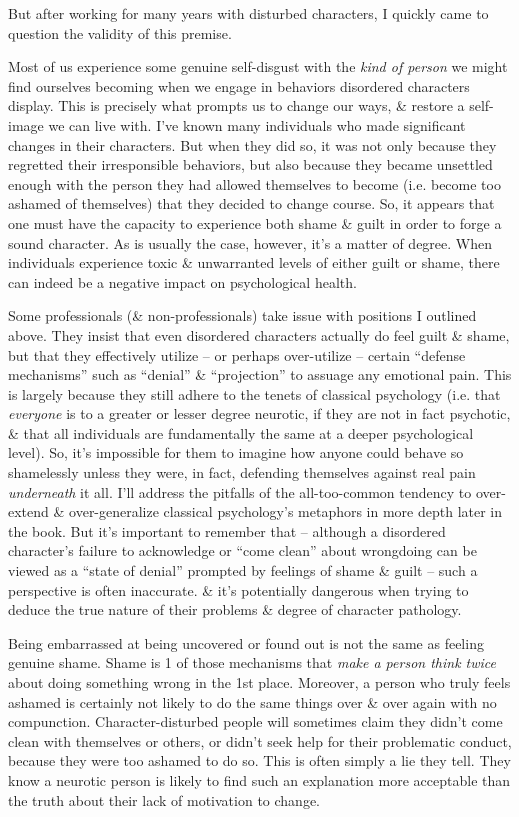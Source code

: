 \documentclass{article}
\numberwithin{equation}{section}
\begin{document}
But after working for many years with disturbed characters, I quickly came to question the validity of this premise.

Most of us experience some genuine self-disgust with  the \textit{kind of person} we might find ourselves becoming when we engage in behaviors disordered characters display. This is precisely what prompts us to change our ways, \& restore a self-image we can live with. I've known many individuals who made significant changes in their characters. But when they did so, it was not only because they regretted their irresponsible behaviors, but also because they became unsettled enough with the person they had allowed themselves to become (i.e. become too ashamed of themselves) that they decided to change course. So, it appears that one must have the capacity to experience both shame \& guilt in order to forge a sound character. As is usually the case, however, it's a matter of degree. When individuals experience toxic \& unwarranted levels of either guilt or shame, there can indeed be a negative impact on psychological health.

Some professionals (\& non-professionals) take issue with positions I outlined above. They insist that even disordered characters actually do feel guilt \& shame, but that they effectively utilize -- or perhaps over-utilize -- certain ``defense mechanisms'' such as ``denial'' \& ``projection'' to assuage any emotional pain. This is largely because they still adhere to the tenets of classical psychology (i.e. that \textit{everyone} is to a greater or lesser degree neurotic, if they are not in fact psychotic, \& that all individuals are fundamentally the same at a deeper psychological level). So, it's impossible for them to imagine how anyone could behave so shamelessly unless they were, in fact, defending themselves against real pain \textit{underneath} it all. I'll address the pitfalls of the all-too-common tendency to over-extend \& over-generalize classical psychology's metaphors in more depth later in the book. But it's important to remember that -- although a disordered character's failure to acknowledge or ``come clean'' about wrongdoing can be viewed as a ``state of denial'' prompted by feelings of shame \& guilt -- such a perspective is often inaccurate. \& it's potentially dangerous when trying to deduce the true nature of their problems \& degree of character pathology.

Being embarrassed at being uncovered or found out is not the same as feeling genuine shame. Shame is 1 of those mechanisms that \textit{make a person think twice} about doing something wrong in the 1st place. Moreover, a person who truly feels ashamed is certainly not likely to do the same things over \& over again with no compunction. Character-disturbed people will sometimes claim they didn't come clean with themselves or others, or didn't seek help for their problematic conduct, because they were too ashamed to do so. This is often simply a lie they tell. They know a neurotic person is likely to find such an explanation more acceptable than the truth about their lack of motivation to change.
\end{document}
